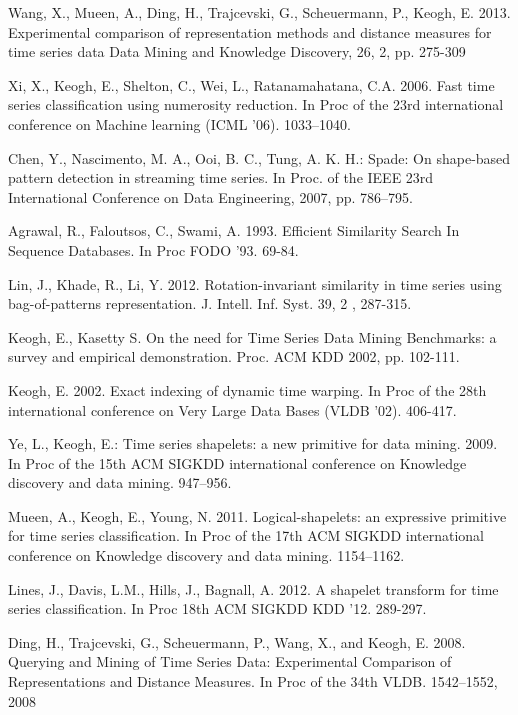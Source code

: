 \documentclass{llncs}
\begin{document}
%
%
\begin{thebibliography}{5}


Wang, X., Mueen, A., Ding, H., Trajcevski, G., Scheuermann, P., Keogh, E. 2013.
Experimental comparison of representation methods and distance measures for time series data
Data Mining and Knowledge Discovery, 26, 2, pp. 275-309

Xi, X., Keogh, E., Shelton, C., Wei, L., Ratanamahatana, C.A. 2006. 
Fast time series classification using numerosity reduction. 
In Proc of the 23rd international conference on Machine learning (ICML '06). 1033--1040.

Chen, Y., Nascimento, M. A., Ooi, B. C., Tung, A. K. H.:
Spade: On shape-based pattern detection in streaming time series. 
In Proc. of the IEEE 23rd International Conference on Data Engineering, 2007, pp. 786–795.

Agrawal, R., Faloutsos, C., Swami, A. 1993.
Efficient Similarity Search In Sequence Databases.
In Proc FODO '93. 69-84.

Lin, J., Khade, R., Li, Y. 2012.
Rotation-invariant similarity in time series using bag-of-patterns representation. 
J. Intell. Inf. Syst. 39, 2 , 287-315.

Keogh, E., Kasetty S. 
On the need for Time Series Data Mining Benchmarks: a survey and empirical demonstration.
Proc. ACM KDD 2002, pp. 102-111.

Keogh, E. 2002. 
Exact indexing of dynamic time warping. 
In Proc of the 28th international conference on Very Large Data Bases (VLDB '02). 406-417.

Ye, L., Keogh, E.:
Time series shapelets: a new primitive for data mining. 2009.
In Proc of the 15th ACM SIGKDD international conference on Knowledge discovery and data
mining. 947--956.

Mueen, A., Keogh, E., Young, N. 2011.
Logical-shapelets: an expressive primitive for time series classification.
In Proc of the 17th ACM SIGKDD international conference on Knowledge discovery and data
mining. 1154--1162.

Lines, J., Davis, L.M., Hills, J., Bagnall, A. 2012.
A shapelet transform for time series classification. 
In Proc 18th ACM SIGKDD KDD '12. 289-297.

Ding, H., Trajcevski, G., Scheuermann, P., Wang, X., and Keogh, E. 2008.
Querying and Mining of Time Series Data: Experimental Comparison of Representations and Distance
Measures. 
In Proc of the 34th VLDB. 1542–1552, 2008


\end{thebibliography}
\end{document}
